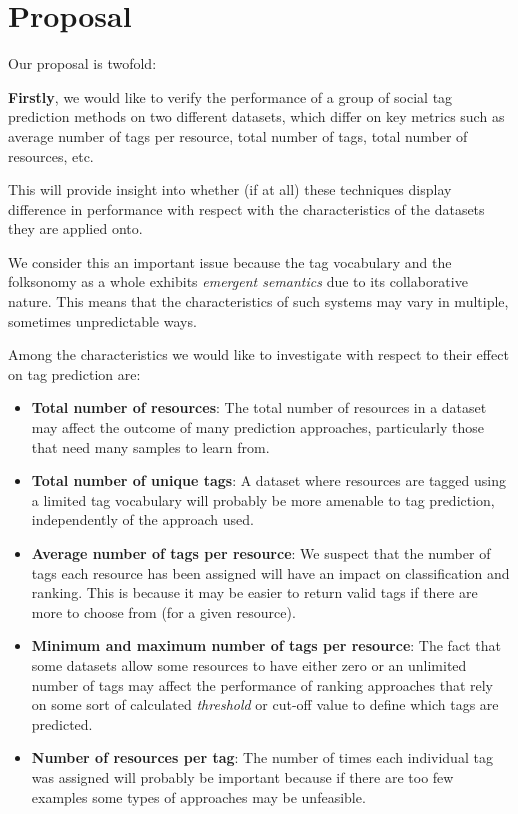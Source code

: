 \chapter{Proposal}\label{chap:proposal}



Our proposal is twofold:

\textbf{Firstly}, we would like to verify the performance of a group of social tag prediction methods on two different datasets, which differ on key metrics such as average number of tags per resource, total number of tags, total number of resources, etc.

This will provide insight into whether (if at all)  these techniques display difference in performance with respect with the characteristics of the datasets they are applied onto.

We consider this an important issue because the tag vocabulary and the folksonomy as a whole exhibits \textit{emergent semantics} \citep{cattuto_etal_2007,koerner_etal_2010} due to its collaborative nature. This means that the characteristics of such systems may vary in multiple, sometimes unpredictable ways.

Among the characteristics we would like to investigate with respect to their effect on tag prediction are:

\begin{itemize}
    \item \textbf{Total number of resources}: The total number of resources in a dataset may affect the outcome of many prediction approaches, particularly those that need many samples to learn from.
    
    \item \textbf{Total number of unique tags}: A dataset where resources are tagged using a limited tag vocabulary will probably be more amenable to tag prediction, independently of the approach used.
    
    \item \textbf{Average number of tags per resource}: We suspect that the number of tags each resource has been assigned will have an impact on classification and ranking. This is because it may be easier to return valid tags if there are more to choose from (for a given resource).
    
    \item \textbf{Minimum and maximum number of tags per resource}: The fact that some datasets allow some resources to have either zero or an unlimited number of tags may affect the performance of ranking approaches that rely on some sort of calculated \textit{threshold} or cut-off value to define which tags are predicted.
    
    \item \textbf{Number of resources per tag}: The number of times each individual tag was assigned will probably be important because if there are too few examples some types of approaches may be unfeasible.

\end{itemize}

